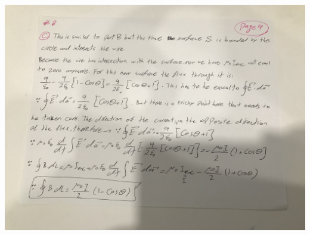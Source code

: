 \documentclass[fleqn]{article}
\begin{document}
\begin{enumerate}
    \pagebreak

    \includegraphics[height=13cm, width=15cm]{8D.jpg}

    \pagebreak


  \end{enumerate}
\end{document}
